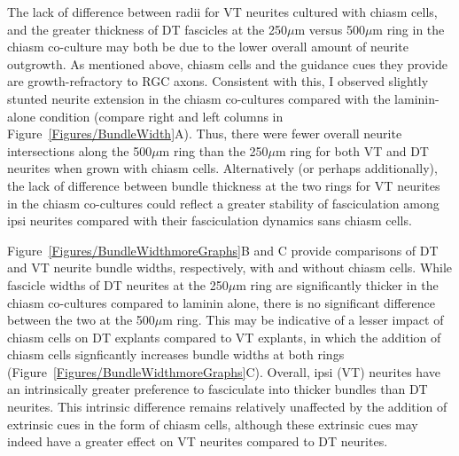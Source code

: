 The lack of difference between radii for VT neurites cultured with chiasm cells, and the greater thickness of DT fascicles at the 250$\mu$m versus 500$\mu$m ring in the chiasm co-culture may both be due to the lower overall amount of neurite outgrowth.
As mentioned above, chiasm cells and the guidance cues they provide are growth-refractory to RGC axons.
Consistent with this, I observed slightly stunted neurite extension in the chiasm co-cultures compared with the laminin-alone condition (compare right and left columns in Figure~\ref{Figures/BundleWidth}A).
Thus, there were fewer overall neurite intersections along the 500$\mu$m ring than the 250$\mu$m ring for both VT and DT neurites when grown with chiasm cells.
Alternatively (or perhaps additionally), the lack of difference between bundle thickness at the two rings for VT neurites in the chiasm co-cultures could reflect a greater stability of fasciculation among ipsi neurites compared with their fasciculation dynamics sans chiasm cells.

Figure~\ref{Figures/BundleWidthmoreGraphs}B and C provide comparisons of DT and VT neurite bundle widths, respectively, with and without chiasm cells.
While fascicle widths of DT neurites at the 250$\mu$m ring are significantly thicker in the chiasm co-cultures compared to laminin alone, there is no significant difference between the two at the 500$\mu$m ring.
This may be indicative of a lesser impact of chiasm cells on DT explants compared to VT explants, in which the addition of chiasm cells signficantly increases bundle widths at both rings (Figure~\ref{Figures/BundleWidthmoreGraphs}C).
Overall, ipsi (VT) neurites have an intrinsically greater preference to fasciculate into thicker bundles than DT neurites.
This intrinsic difference remains relatively unaffected by the addition of extrinsic cues in the form of chiasm cells, although these extrinsic cues may indeed have a greater effect on VT neurites compared to DT neurites.
